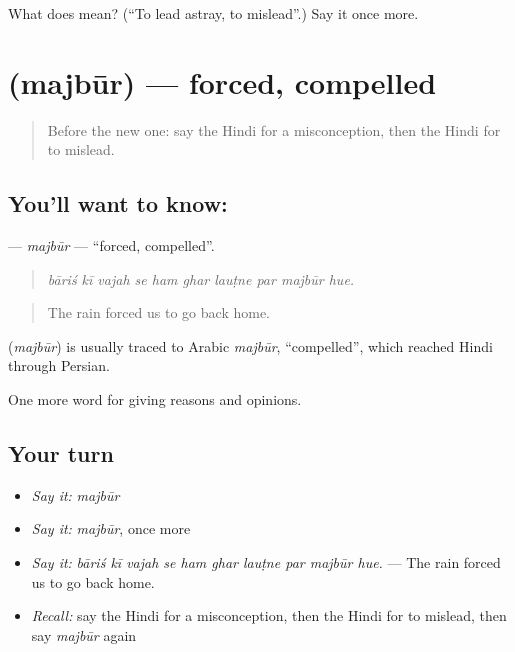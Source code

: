 \begin{tcolorbox}[breakable,colback=teal!4,colframe=teal!35!black,title={Before you move on}]
What does  mean? (\textquotedblleft{}To lead astray, to mislead\textquotedblright{}.) Say it once more.
\end{tcolorbox}
\section[\texorpdfstring{\hi{मजबूर} (majbūr)}{मजबूर (majbūr)}]{ (majbūr) — forced, compelled}

\label{lesson:HI-C366-majbur}



\begin{quote}
Before the new one: say the Hindi for a misconception, then the Hindi for to mislead.
\end{quote}

\subsection*{You'll want to know: }
\textbf{} — \emph{majbūr} — \textquotedblleft{}forced, compelled\textquotedblright{}.

\begin{quote}
         
\end{quote}

\begin{quote}
\emph{bāriś kī vajah se ham ghar lauṭne par majbūr hue.}
\end{quote}

\begin{quote}
The rain forced us to go back home.
\end{quote}

\begin{cousinweb}
\textbf{} (\emph{majbūr}) is usually traced to Arabic \emph{majbūr}, \textquotedblleft{}compelled\textquotedblright{}, which reached Hindi through Persian.
\end{cousinweb}

\begin{grammarlens}[title={What you've built}]
One more word for giving reasons and opinions.
\end{grammarlens}

\subsection*{Your turn}
\begin{itemize}
\raggedright
  \item \emph{Say it:} \emph{majbūr}
  \item \emph{Say it:} \emph{majbūr}, once more
  \item \emph{Say it:} \emph{bāriś kī vajah se ham ghar lauṭne par majbūr hue.} — The rain forced us to go back home.
  \item \emph{Recall:} say the Hindi for a misconception, then the Hindi for to mislead, then say \emph{majbūr} again
\end{itemize}

